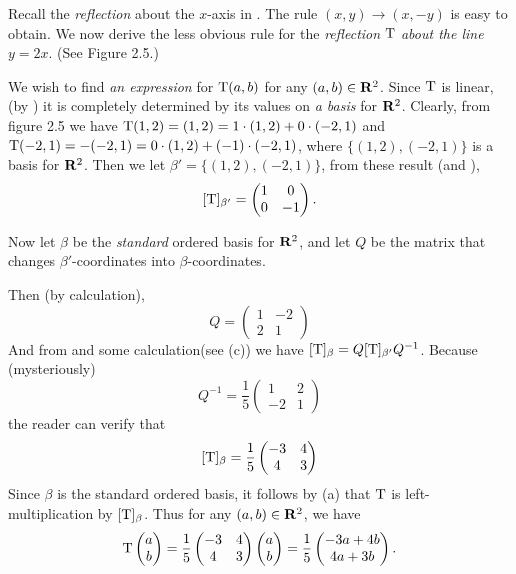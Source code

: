 \begin{example} \label{example 2.5.3}
Recall the \emph{reflection} about the \(x\)-axis in .
The rule \((x, y) \to (x, -y)\) is easy to obtain.
We now derive the less obvious rule for the \emph{reflection} \(\mathrm{T}\) \emph{about the line} \(y = 2x\). (See Figure 2.5.)

We wish to find \emph{an expression} for \(\mathrm{T}(a,b)\) for any \((a,b) \in \mathbf{R}^2\).
Since \(\mathrm{T}\) is linear, (by ) it is completely
determined by its values on \emph{a basis} for \(\mathbf{R}^2\).
Clearly, from figure 2.5 we have \(\mathrm{T}(1, 2) = (1, 2) = 1 \cdot (1, 2) + 0 \cdot (-2, 1)\) and \(\mathrm{T}(-2, 1) = -(-2, 1) = 0 \cdot (1, 2) + (-1) \cdot (-2, 1)\), where \(\{ (1, 2), (-2, 1) \}\) is a basis for \(\mathbf{R}^2\).
Then we let \(\beta' = \{ (1, 2), (-2, 1) \}\), from these result (and ),
\[
    [\mathrm{T}]_{\beta'} = \begin{pmatrix} 1 & 0 \\ 0 & -1 \end{pmatrix}.
\]

Now let \(\beta\) be the \emph{standard} ordered basis for \(\mathbf{R}^2\), and let \(Q\) be the matrix that changes \(\beta'\)-coordinates into \(\beta\)-coordinates.

Then (by calculation),
\[
    Q = \begin{pmatrix} 1 & -2 \\ 2 & 1 \end{pmatrix}
\]
And from  and some calculation(see (c)) we have \([\mathrm{T}]_{\beta} = Q[\mathrm{T}]_{\beta'}Q^{-1}\).
Because (mysteriously)
\[
    Q^{-1} = \frac{1}{5} \begin{pmatrix} 1 & 2 \\ -2 & 1 \end{pmatrix}
\]
the reader can verify that
\[
    [\mathrm{T}]_{\beta} = \frac{1}{5} \begin{pmatrix} -3 & 4 \\ 4 & 3 \end{pmatrix}
\]
Since \(\beta\) is the standard ordered basis, it follows by (a) that \(\mathrm{T}\) is left-multiplication by \([\mathrm{T}]_{\beta}\).
Thus for any \((a, b) \in \mathbf{R}^2\), we have
\[
    \mathrm{T} \begin{pmatrix} a \\ b \end{pmatrix}
    = \frac{1}{5} \begin{pmatrix} -3 & 4 \\ 4 & 3 \end{pmatrix} \begin{pmatrix} a \\ b \end{pmatrix}
    = \frac{1}{5} \begin{pmatrix} -3a + 4b \\ 4a + 3b \end{pmatrix}.
\]
\end{example}

